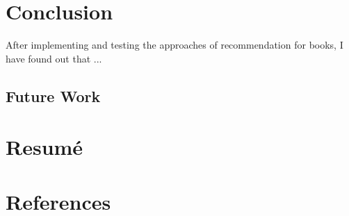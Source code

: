 \documentclass[\myFontSize,a4paper,oneside,english,hidelinks]{article}
\begin{document}

\clearpage{}
\section{Conclusion}
After implementing and testing the approaches of recommendation for books, I have found out that ...\\


\subsection{Future Work}

\clearpage
\thispagestyle{empty}
\mbox{}


\clearpage{}
\section{Resumé}




\clearpage 
\section*{References} %
\renewcommand{\refname}{}

\normalsize 
 
 
\nocite{*}
\end{document}
